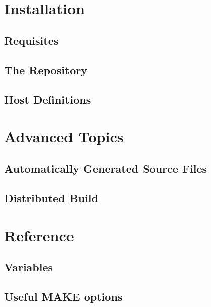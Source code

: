 \documentclass[a4paper]{book}
\begin{document}
\chapter{Installation}

\section{Requisites}
\section{The Repository}
\section{Host Definitions}


\chapter{Advanced Topics}

\section{Automatically Generated Source Files}
\section{Distributed Build}


\chapter{Reference}

\section{Variables}
\section{Useful MAKE options}

\end{document}
